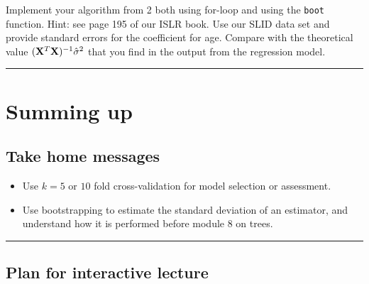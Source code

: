 \documentclass[]{article}
\newenvironment{Shaded}{\begin{snugshade}}{\end{snugshade}}
\newcommand{\DataTypeTok}[1]{\textcolor[rgb]{0.13,0.29,0.53}{#1}}
\newcommand{\DecValTok}[1]{\textcolor[rgb]{0.00,0.00,0.81}{#1}}
\newcommand{\KeywordTok}[1]{\textcolor[rgb]{0.13,0.29,0.53}{\textbf{#1}}}
\newcommand{\NormalTok}[1]{#1}
\newcommand{\OperatorTok}[1]{\textcolor[rgb]{0.81,0.36,0.00}{\textbf{#1}}}
\newcommand{\StringTok}[1]{\textcolor[rgb]{0.31,0.60,0.02}{#1}}
\providecommand{\tightlist}{%
  \setlength{\itemsep}{0pt}\setlength{\parskip}{0pt}}
\begin{document}
Implement your algorithm from 2 both using for-loop and using the
\texttt{boot} function. Hint: see page 195 of our ISLR book. Use our
SLID data set and provide standard errors for the coefficient for age.
Compare with the theoretical value
\(({\bf X}^T{\bf X})^{-1}\hat{\sigma}^2\) that you find in the output
from the regression model.

\begin{Shaded}
\end{Shaded}

\begin{center}\rule{0.5\linewidth}{\linethickness}\end{center}

\hypertarget{summing-up}{%
\section{Summing up}\label{summing-up}}

\hypertarget{take-home-messages}{%
\subsection{Take home messages}\label{take-home-messages}}

\begin{itemize}
\tightlist
\item
  Use \(k=5\) or \(10\) fold cross-validation for model selection or
  assessment.
\item
  Use bootstrapping to estimate the standard deviation of an estimator,
  and understand how it is performed before module 8 on trees.
\end{itemize}

\begin{center}\rule{0.5\linewidth}{\linethickness}\end{center}

\hypertarget{plan-for-interactive-lecture}{%
\subsection{Plan for interactive
lecture}\label{plan-for-interactive-lecture}}
\end{document}
